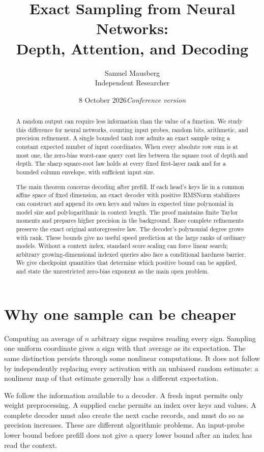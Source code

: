 \documentclass[11pt]{article}
\title{Exact Sampling from Neural Networks:\\Depth, Attention, and Decoding}
\author{Samuel Mausberg\\{\normalsize Independent Researcher}}
\date{8 October 2026\quad\textit{Conference version}}
\theoremstyle{definition}\newtheorem{definition}[theorem]{Definition}
\theoremstyle{remark}\newtheorem{remark}[theorem]{Remark}
\numberwithin{equation}{section}
\begin{document}
\maketitle
\begin{abstract}
A random output can require less information than the value of a
function. We study this difference for neural networks, counting input
probes, random bits, arithmetic, and precision refinement. A single
bounded tanh row admits an exact sample using a constant expected
number of input coordinates. When every absolute row sum is at most one,
the zero-bias worst-case query cost lies between the square root of
depth and depth. The sharp square-root law holds at every fixed
first-layer rank and for a bounded column envelope, with sufficient
input size.

The main theorem concerns decoding after prefill. If each head's keys
lie in a common affine space of fixed dimension, an exact decoder with
positive RMSNorm stabilizers can construct and append its own keys and
values in expected time polynomial in model size and polylogarithmic in
context length. The proof maintains finite Taylor moments and prepares
higher precision in the background. Rare complete refinements preserve
the exact original autoregressive law. The decoder's polynomial degree grows
with rank. These bounds give no useful speed prediction at the large
ranks of ordinary models. Without a context index, standard score
scaling can force linear search; arbitrary growing-dimensional indexed
queries also face a conditional hardness barrier. We give checkpoint
quantities that determine which positive bound can be applied, and
state the unrestricted zero-bias exponent as the main open problem.
\end{abstract}

\section{Why one sample can be cheaper}

Computing an average of $n$ arbitrary signs requires reading every
sign. Sampling one uniform coordinate gives a sign with that average
as its expectation. The same distinction persists through some
nonlinear computations. It does not follow by independently replacing
every activation with an unbiased random estimate: a nonlinear map of
that estimate generally has a different expectation.

We follow the information available to a decoder. A fresh input permits
only weight preprocessing. A supplied cache permits an index over keys
and values. A complete decoder must also create the next cache records,
and must do so as precision increases. These are different algorithmic
problems. An input-probe lower bound before prefill does not give a
query lower bound after an index has read the context.
\end{document}
